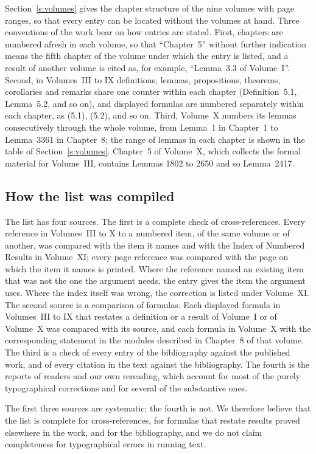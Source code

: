 \documentclass{situationist-preprint}
\begin{document}
Section~\ref{s:volumes} gives the chapter structure of the nine volumes with page ranges, so that every entry can be located without the volumes at hand. Three conventions of the work bear on how entries are stated. First, chapters are numbered afresh in each volume, so that \enquote{Chapter~5} without further indication means the fifth chapter of the volume under which the entry is listed, and a result of another volume is cited as, for example, \enquote{Lemma~3.3 of Volume~I}. Second, in Volumes~III to IX definitions, lemmas, propositions, theorems, corollaries and remarks share one counter within each chapter (Definition~5.1, Lemma~5.2, and so on), and displayed formulas are numbered separately within each chapter, as (5.1), (5.2), and so on. Third, Volume~X numbers its lemmas consecutively through the whole volume, from Lemma~1 in Chapter~1 to Lemma~3361 in Chapter~8; the range of lemmas in each chapter is shown in the table of Section~\ref{s:volumes}. Chapter~5 of Volume~X, which collects the formal material for Volume~III, contains Lemmas 1802 to 2650 and so Lemma~2417.

\subsection{How the list was compiled}

The list has four sources. The first is a complete check of cross-references. Every reference in Volumes~III to X to a numbered item, of the same volume or of another, was compared with the item it names and with the Index of Numbered Results in Volume~XI; every page reference was compared with the page on which the item it names is printed. Where the reference named an existing item that was not the one the argument needs, the entry gives the item the argument uses. Where the index itself was wrong, the correction is listed under Volume~XI. The second source is a comparison of formulas. Each displayed formula in Volumes~III to IX that restates a definition or a result of Volume~I or of Volume~X was compared with its source, and each formula in Volume~X with the corresponding statement in the modules described in Chapter~8 of that volume. The third is a check of every entry of the bibliography against the published work, and of every citation in the text against the bibliography. The fourth is the reports of readers and our own rereading, which account for most of the purely typographical corrections and for several of the substantive ones.

The first three sources are systematic; the fourth is not. We therefore believe that the list is complete for cross-references, for formulas that restate results proved elsewhere in the work, and for the bibliography, and we do not claim completeness for typographical errors in running text.
\end{document}
